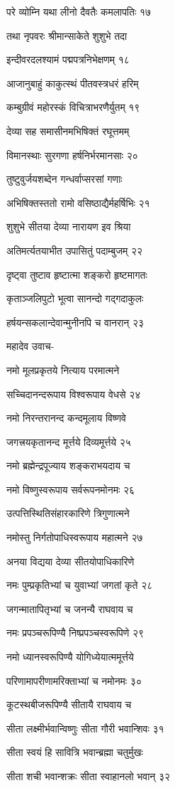 परे व्योम्नि यथा लीनो दैवतैः कमलापतिः १७

तथा नृपवरः श्रीमान्साकेते शुशुभे तदा

इन्दीवरदलश्यामं पद्मपत्रनिभेक्षणम् १८

आजानुबाहुं काकुत्स्थं पीतवस्त्रधरं हरिम्

कम्बुग्रीवं महोरस्कं विचित्राभरणैर्युतम् १९

देव्या सह समासीनमभिषिक्तं रघूत्तमम्

विमानस्थाः सुरगणा हर्षनिर्भरमानसाः २०

तुष्टुवुर्जयशब्देन गन्धर्वाप्सरसां गणाः

अभिषिक्तस्ततो रामो वसिष्ठाद्यैर्महर्षिभिः २१

शुशुभे सीतया देव्या नारायण इव श्रिया

अतिमर्त्यतयाभीत उपासितुं पदाम्बुजम् २२

दृष्ट्वा तुष्टाव हृष्टात्मा शङ्करो हृष्टमागतः

कृताञ्जलिपुटो भूत्वा सानन्दो गद्गदाकुलः

हर्षयन्सकलान्देवान्मुनीनपि च वानरान् २३

महादेव उवाच-

नमो मूलप्रकृतये नित्याय परमात्मने

सच्चिदानन्दरूपाय विश्वरूपाय वेधसे २४

नमो निरन्तरानन्द कन्दमूलाय विष्णवे

जगत्त्रयकृतानन्द मूर्त्तये दिव्यमूर्त्तये २५

नमो ब्रह्मेन्द्रपूज्याय शङ्कराभयदाय च

नमो विष्णुस्वरूपाय सर्वरूपनमोनमः २६

उत्पत्तिस्थितिसंहारकारिणे त्रिगुणात्मने

नमोस्तु निर्गतोपाधिस्वरूपाय महात्मने २७

अनया विद्यया देव्या सीतयोपाधिकारिणे

नमः पुम्प्रकृतिभ्यां च युवाभ्यां जगतां कृते २८

जगन्मातापितृभ्यां च जनन्यै राघवाय च

नमः प्रपञ्चरूपिण्यै निष्प्रपञ्चस्वरूपिणे २९

नमो ध्यानस्वरूपिण्यै योगिध्येयात्ममूर्त्तये

परिणामापरीणामरिक्ताभ्यां च नमोनमः ३०

कूटस्थबीजरूपिण्यै सीतायै राघवाय च

सीता लक्ष्मीर्भवान्विष्णुः सीता गौरी भवान्शिवः ३१

सीता स्वयं हि सावित्रि भवान्ब्रह्मा चतुर्मुखः

सीता शची भवान्शक्रः सीता स्वाहानलो भवान् ३२

